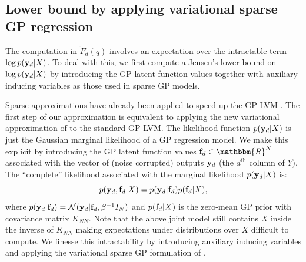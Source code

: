 \documentclass[twoside,times]{article}
\begin{document}
\subsection{Lower bound  by applying
 variational sparse GP regression}

The computation in $\widetilde{F}_d (q)$ involves an
expectation over the intractable term 
$\log p(\mathbf{y}_d |X)$. To deal with this, we first compute a Jensen's
lower bound on $\log p(\mathbf{y}_d| X)$ by introducing the GP latent
function values together with auxiliary inducing variables as those
used in sparse GP models. 

Sparse approximations have already been applied to speed up the GP-LVM
\cite{Lawrence:larger07}. The first step of our approximation is
equivalent to applying the new variational approximation of
\citet{Titsias:variational09} to the standard GP-LVM. The likelihood
function $p(\mathbf{y}_d|X)$ is just the Gaussian marginal likelihood of a
GP regression model. We %
make this explicit by introducing the GP
latent function values $\bff_{d} \in \mathbbm{R}^N$ associated with
the vector of (noise corrupted) outputs $\mathbf{y}_d$ (the $d^{\text{th}}$ column of
$Y$). The ``complete'' likelihood %
associated with the
marginal likelihood $p(\mathbf{y}_d|X)$ is:
\begin{equation}
p(\mathbf{y}_d,\mathbf{f}_d|X) = p(\mathbf{y}_d|\mathbf{f}_d)
p(\mathbf{f}_d|X),
\label{eq:jointmodelwithlatent}
\end{equation}     
where $p(\mathbf{y}_d|\mathbf{f}_d) = \mathcal{N}(\mathbf{y}_d | \mathbf{f}_d, \beta^{-1} I_N)$ and
$p(\mathbf{f}_d|X)$ is the zero-mean GP prior with covariance matrix
$K_{NN}$. Note that the above joint %
model still contains
$X$ inside the inverse of $K_{NN}$ making expectations under
distributions over $X$ difficult to compute. We finesse this
intractability by introducing auxiliary inducing variables and
applying the variational sparse GP formulation of
\citet{Titsias:variational09}.
 
\end{document}
